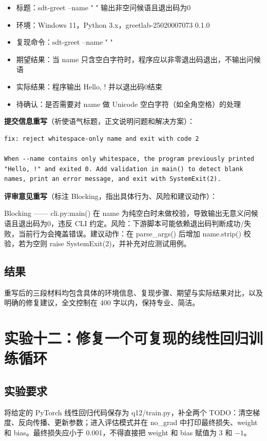 \documentclass[UTF8]{ctexart}
\begin{document}
\begin{itemize}
\item 标题：sdt-greet --name " " 输出非空问候语且退出码为0
\item 环境：Windows 11，Python 3.x，greetlab-25020007073 0.1.0
\item 复现命令：sdt-greet --name " "
\item 期望结果：当 name 只含空白字符时，程序应以非零退出码退出，不输出问候语
\item 实际结果：程序输出 Hello, ! 并以退出码0结束
\item 待确认：是否需要对 name 做 Unicode 空白字符（如全角空格）的处理
\end{itemize}

\textbf{提交信息重写}（祈使语气标题，正文说明问题和解决方案）：

\begin{lstlisting}
fix: reject whitespace-only name and exit with code 2

When --name contains only whitespace, the program previously printed
"Hello, !" and exited 0. Add validation in main() to detect blank
names, print an error message, and exit with SystemExit(2).
\end{lstlisting}

\textbf{评审意见重写}（标注 Blocking，指出具体行为、风险和建议动作）：

Blocking —— cli.py:main() 在 name 为纯空白时未做校验，导致输出无意义问候语且退出码为0，违反 CLI 约定。风险：下游脚本可能依赖退出码判断成功/失败，当前行为会掩盖错误。建议动作：在 parse\_args() 后增加 name.strip() 校验，若为空则 raise SystemExit(2)，并补充对应测试用例。

\subsection{结果}

重写后的三段材料均包含具体的环境信息、复现步骤、期望与实际结果对比，以及明确的修复建议，全文控制在 400 字以内，保持专业、简洁。

\section{实验十二：修复一个可复现的线性回归训练循环}

\subsection{实验要求}

将给定的 PyTorch 线性回归代码保存为 q12/train.py，补全两个 TODO：清空梯度、反向传播、更新参数；进入评估模式并在 no\_grad 中打印最终损失、weight 和 bias。最终损失应小于 0.001，不得直接把 weight 和 bias 赋值为 3 和 $-1$。
\end{document}
